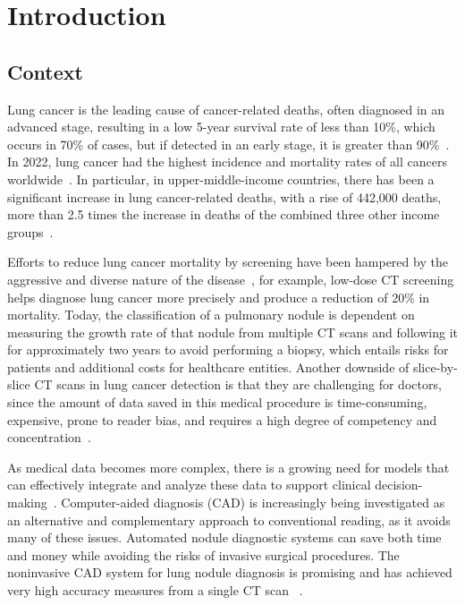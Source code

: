 \chapter{Introduction} \label{chap:intro}


\section{Context} \label{sec:context}

Lung cancer is the leading cause of cancer-related deaths, often diagnosed in an advanced stage, resulting in a low 5-year survival rate of less than 10\%, which occurs in 70\% of cases, but if detected in an early stage, it is greater than 90\%~\cite{bahmer_benefits_2011}. In 2022, lung cancer had the highest incidence and mortality rates of all cancers worldwide~\cite{gco_lung_2024}. In particular, in upper-middle-income countries, there has been a significant increase in lung cancer-related deaths, with a rise of 442,000 deaths, more than 2.5 times the increase in deaths of the combined three other income groups~\cite{who_death_cause_2024}.

Efforts to reduce lung cancer mortality by screening have been hampered by the aggressive and diverse nature of the disease~\cite{NLST}, for example, low-dose CT screening helps diagnose lung cancer more precisely and produce a reduction of 20\% in mortality. Today, the classification of a pulmonary nodule is dependent on measuring the growth rate of that nodule from multiple CT scans and following it for approximately two years to avoid performing a biopsy, which entails risks for patients and additional costs for healthcare entities. Another downside of slice-by-slice CT scans in lung cancer detection is that they are challenging for doctors, since the amount of data saved in this medical procedure is time-consuming, expensive, prone to reader bias, and requires a high degree of competency and concentration~\cite{Shaffie2022}.

As medical data becomes more complex, there is a growing need for models that can effectively integrate and analyze these data to support clinical decision-making~\cite{Iqbal2023}. Computer-aided diagnosis (CAD) is increasingly being investigated as an alternative and complementary approach to conventional reading, as it avoids many of these issues. Automated nodule diagnostic systems can save both time and money while avoiding the risks of invasive surgical procedures. The noninvasive CAD system for lung nodule diagnosis is promising and has achieved very high accuracy measures from a single CT scan ~\cite{Shaffie2022}.

